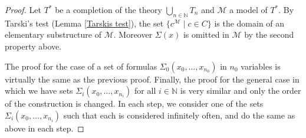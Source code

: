 \documentclass[10pt]{amsart}
\newcommand{\NNN}{\mathbb{N}}
\newcommand{\MM}{\mathcal{M}}
\theoremstyle{definition}
\theoremstyle{remark}
\begin{document}
\begin{proof}
Let $T^*$ be a completion of the theory $\bigcup_{n\in\NNN} T_n$ and $\MM$ a model of $T^*$. By Tarski's test (Lemma \ref{Tarskis test}), the set $\{c^\MM\mid c\in C\}$ is the domain of an elementary substructure of $\MM$. Moreover $\Sigma(x)$ is omitted in $\MM$ by the second property above. 

The proof for the case of a set of formulas $\Sigma_0(x_0,\dots,x_{n_0})$ in $n_0$ variables is virtually the same as the previous proof. Finally, the proof for the general case in which we have sets $\Sigma_i(x_0,\dots,x_{n_i})$ for all $i\in\NNN$ is very similar and only the order of the construction is changed. In each step, we consider one of the sets $\Sigma_i(x_0,\dots,x_{n_i})$ such that each is considered infinitely often, and do the same as above in each step.  
\end{proof} 
\end{document}
